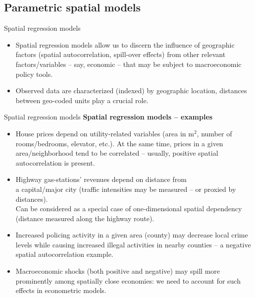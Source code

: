 \documentclass{beamer}
\begin{document}
\subsection{Parametric spatial models}
\begin{frame}{Spatial regression models}
\begin{itemize}
\item Spatial regression models allow us to discern the influence of geographic factors (spatial autocorrelation, spill-over effects) from other relevant factors/variables -- say, economic -- that may be subject to macroeconomic policy tools.
\medskip
\item Observed data are characterized (indexed) by geographic location, distances between geo-coded units play a crucial role.
\end{itemize}
\end{frame}
\begin{frame}{Spatial regression models}
\textbf{Spatial regression models -- examples}
\medskip
\begin{itemize}
	\item House prices depend on utility-related variables (area in m$^2$, number of rooms/bedrooms, elevator, etc.). At the same time, prices in a given area/neighborhood tend to be correlated -- usually, positive spatial autocorrelation is present. 
	\smallskip
	\item Highway gas-stations' revenues depend on distance from \\a capital/major city (traffic intensities may be measured -- or proxied by distances). \\Can be considered as a special case of one-dimensional spatial dependency (distance measured along the highway route). 
	\smallskip
	\item Increased policing activity in a given area (county) may decrease local crime levels while causing increased illegal activities in nearby counties -- a negative spatial autocorrelation example.
	\smallskip
	\item Macroeconomic shocks (both positive and negative) may spill more prominently among spatially close economies: we need to account for such effects in econometric models.
	\end{itemize}
\end{frame}
\end{document}

